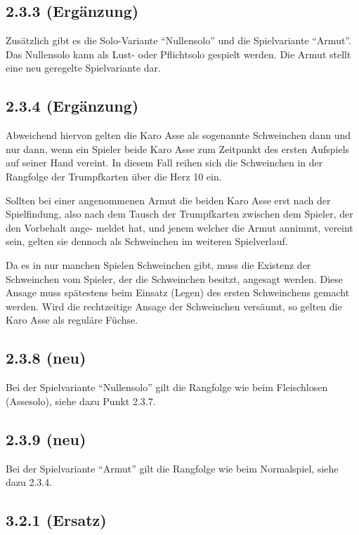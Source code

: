 \subsection*{2.3.3 (Ergänzung)}

Zusätzlich gibt es die Solo-Variante ``Nullensolo'' und die
Spielvariante ``Armut''. Das Nullensolo kann als Lust- oder Pflichtsolo
gespielt werden. Die Armut stellt eine neu geregelte Spielvariante dar.

\subsection*{2.3.4 (Ergänzung)}

Abweichend hiervon gelten die Karo Asse als sogenannte Schweinchen dann
und nur dann, wenn ein Spieler beide Karo Asse zum Zeitpunkt des ersten
Aufspiels auf seiner Hand vereint. In diesem Fall reihen sich die
Schweinchen in der Rangfolge der Trumpfkarten über die Herz 10 ein.

Sollten bei einer angenommenen Armut die beiden Karo Asse erst nach der
Spielfindung, also nach dem Tausch der Trumpfkarten zwischen dem
Spieler, der den Vorbehalt ange- meldet hat, und jenem welcher die Armut
annimmt, vereint sein, gelten sie dennoch als Schweinchen im weiteren
Spielverlauf.

Da es in nur manchen Spielen Schweinchen gibt, muss die Existenz der
Schweinchen vom Spieler, der die Schweinchen besitzt, angesagt werden.
Diese Ansage muss spätestens beim Einsatz (Legen) des ersten
Schweinchens gemacht werden. Wird die rechtzeitige Ansage der
Schweinchen versäumt, so gelten die Karo Asse als reguläre Füchse.

\subsection*{2.3.8 (neu)}

Bei der Spielvariante ``Nullensolo'' gilt die Rangfolge wie beim
Fleischlosen (Assesolo), siehe dazu Punkt 2.3.7.

\subsection*{2.3.9 (neu)}

Bei der Spielvariante ``Armut'' gilt die Rangfolge wie beim Normalspiel,
siehe dazu 2.3.4.

\subsection*{3.2.1 (Ersatz)}

